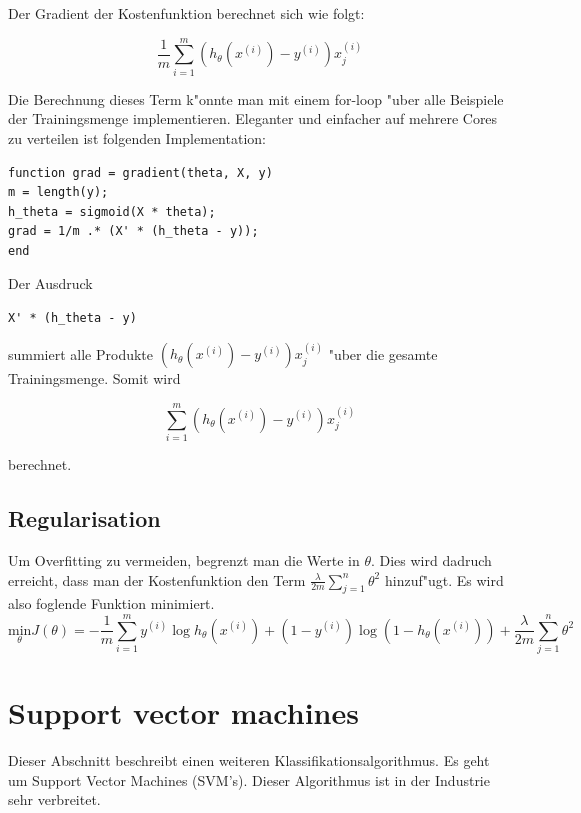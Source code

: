 \documentclass[12pt,a4paper,twoside]{article}
\begin{document}
Der Gradient der Kostenfunktion berechnet sich wie folgt:

\begin{equation}
\frac{1}{m} \sum_{i=1}^m (h_{\theta} (x^{(i)}) - y^{(i)})x_j^{(i)}  
\end{equation}

Die Berechnung dieses Term k"onnte man mit einem for-loop "uber alle Beispiele der Trainingsmenge implementieren. Eleganter und einfacher auf mehrere Cores zu verteilen ist folgenden Implementation:

\begin{lstlisting}
function grad = gradient(theta, X, y)
m = length(y);
h_theta = sigmoid(X * theta);
grad = 1/m .* (X' * (h_theta - y));
end
\end{lstlisting}

Der Ausdruck 
\begin{lstlisting}
X' * (h_theta - y)
\end{lstlisting}
summiert alle Produkte $(h_{\theta} (x^{(i)}) - y^{(i)})x_j^{(i)}  $ "uber die gesamte Trainingsmenge. Somit wird

\begin{equation}
   \sum_{i=1}^m (h_{\theta} (x^{(i)}) - y^{(i)})x_j^{(i)}
\end{equation}

berechnet.

\subsection{Regularisation}
\label{sec:regularization}

Um Overfitting zu vermeiden, begrenzt man die Werte in $\theta$. Dies wird dadruch erreicht, dass man der Kostenfunktion den Term $\frac{\lambda}{2m} \sum_{j=1}^n \theta^2$ hinzuf"ugt. Es wird also foglende Funktion minimiert.
\begin{equation}
  \label{eq:regularization}
  \underset{\theta}{\text{min}}  J(\theta) = -\frac{1}{m} \sum_{i=1}^m y^{(i)} \log h_{\theta}(x^{(i)}) + (1 - y^{(i)}) \log(1 - h_{\theta}(x^{(i)}))+\frac{\lambda}{2m} \sum_{j=1}^n \theta^2
\end{equation}

\section{Support vector machines}
\label{sec:svm}

Dieser Abschnitt beschreibt einen weiteren Klassifikationsalgorithmus. Es geht um Support Vector Machines (SVM's). Dieser Algorithmus ist in der Industrie sehr verbreitet.
\end{document}
